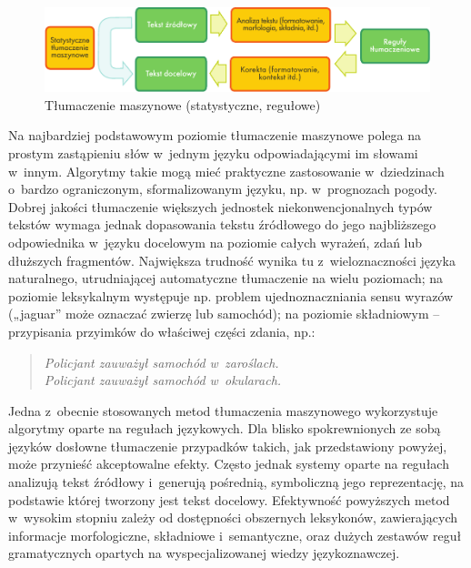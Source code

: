 \begin{multicols}{2}
\begin{figure}[htb]  \center
\includegraphics[width=\textwidth]{../_media/polish/machine_translation}
\caption{Tłumaczenie maszynowe (statystyczne, regułowe)} \label{fig:mtarch_pl}  \end{figure} 


Na najbardziej podstawowym poziomie tłumaczenie maszynowe polega na
prostym zastąpieniu słów w~jednym języku odpowiadającymi im
słowami w~innym. Algorytmy takie mogą mieć praktyczne zastosowanie
w~dziedzinach o~bardzo ograniczonym, sformalizowanym języku, np.
w~prognozach pogody. Dobrej jakości tłumaczenie większych jednostek
niekonwencjonalnych typów tekstów wymaga jednak dopasowania tekstu
źródłowego do jego najbliższego odpowiednika w~języku docelowym
na poziomie całych wyrażeń, zdań lub dłuższych fragmentów.
Największa trudność wynika tu z~wieloznaczności języka
naturalnego, utrudniającej automatyczne tłumaczenie na wielu
poziomach; na poziomie leksykalnym występuje np. problem
ujednoznaczniania sensu wyrazów („jaguar” może oznaczać
zwierzę lub samochód); na poziomie składniowym – przypisania
przyimków do właściwej części zdania, np.: 

\begin{verse} \textit{Policjant zauważył samochód w~zaroślach.}\\
\textit{Policjant zauważył samochód w~okularach.} \end{verse} 

Jedna z~obecnie stosowanych metod tłumaczenia maszynowego
wykorzystuje algorytmy oparte na regułach językowych. Dla blisko
spokrewnionych ze sobą języków dosłowne tłumaczenie przypadków
takich, jak przedstawiony powyżej, może przynieść akceptowalne
efekty. Często jednak systemy oparte na regułach analizują tekst
źródłowy i~generują pośrednią, symboliczną jego reprezentację,
na podstawie której tworzony jest tekst docelowy. Efektywność
powyższych metod w~wysokim stopniu zależy od dostępności
obszernych leksykonów, zawierających informacje morfologiczne,
składniowe i~semantyczne, oraz dużych zestawów reguł gramatycznych
opartych na wyspecjalizowanej wiedzy językoznawczej. 


\end{multicols}
